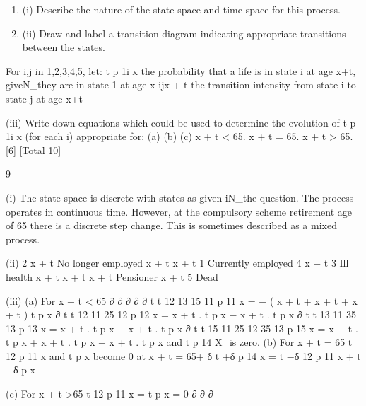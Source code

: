 \documentclass[a4paper,12pt]{article}
\begin{document}

\begin{enumerate}
\item (i) Describe the nature of the state space and time space for this process.
\item (ii) Draw and label a transition diagram indicating appropriate transitions between
the states.
\end{enumerate}



For i,j in {1,2,3,4,5}, let:
t
p 1i x
the probability that a life is in state i at age x+t, giveN_they are in state 1 at age
x
\mu ijx + t the transition intensity from state i to state j at age x+t
\item (iii) Write down equations which could be used to determine the evolution of t p 1i x
(for each i) appropriate for:
(a)
(b)
(c)
x + t < 65.
x + t = 65.
x + t > 65.
[6]
[Total 10]
\newpage


9
\item (i)
The state space is discrete with states as given iN_the question.
The process operates in continuous time.
However, at the compulsory scheme retirement
age of 65 there is a discrete step change.
This is sometimes described as a mixed process.


\item (ii)
2
x + t
No longer
employed
x + t
x + t
1
Currently
employed
4
x + t
3
Ill health
x + t
x + t
x + t
Pensioner
x + t
5
Dead
\item (iii)
(a)
For x + t < 65
∂
∂
∂
∂
∂ t t 12
13
15
11
p 11
x = − ( \mu x + t + \mu x + t + \mu x + t ) t p x
∂ t t 12
11
25
12
p 12
x = \mu x + t . t p x − \mu x + t . t p x
∂ t t 13
11
35
13
p 13
x = \mu x + t . t p x − \mu x + t . t p x
∂ t t 15
11
25
12
35
13
p 15
x = \mu x + t . t p x + \mu x + t . t p x + \mu x + t . t p x
and t p 14
X_is zero.
(b)
For x + t = 65
t
12
p 11
x and t p x become 0 at x + t = 65+ δ
t +δ
p 14
x =
t −δ
12
p 11
x + t −δ p x

(c)
For x + t >65
t
12
p 11
x = t p x = 0
∂
∂
∂
\end{document}
